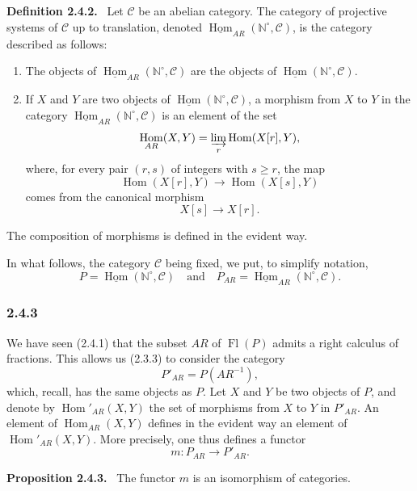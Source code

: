\documentclass[11pt]{article}
\providecommand{\uHom}{\underline{\Hom}}
\providecommand{\NN}{\mathbb{N}}
\newenvironment{statement}[1]{\par\medskip\noindent\textbf{#1.}\ }{\par\medskip}
\DeclareMathOperator{\Hom}{Hom}
\providecommand{\Hom}{\operatorname{Hom}}
\providecommand{\Fl}{\operatorname{Fl}}
\providecommand{\NN}{\mathbb N}
\providecommand{\cC}{\mathcal C}
\providecommand{\cC}{\mathcal C}
\providecommand{\Hom}{\operatorname{Hom}}
\begin{document}
\begin{statement}{Definition 2.4.2}
Let $\cC$ be an abelian category. The category of projective systems of $\cC$ up to translation, denoted $\uHom_{AR}(\NN^\circ,\cC)$, is the category described as follows:
\begin{enumerate}[label=(\roman*)]
\item The objects of $\uHom_{AR}(\NN^\circ,\cC)$ are the objects of $\uHom(\NN^\circ,\cC)$.
\item If $X$ and $Y$ are two objects of $\uHom(\NN^\circ,\cC)$, a morphism from $X$ to $Y$ in the category $\uHom_{AR}(\NN^\circ,\cC)$ is an element of the set
\[
\Hom_{AR}(X,Y)=\varinjlim_r\Hom(X[r],Y),
\]
where, for every pair $(r,s)$ of integers with $s\ge r$, the map
\[
\Hom(X[r],Y)\longrightarrow\Hom(X[s],Y)
\]
comes from the canonical morphism
\[
X[s]\longrightarrow X[r].
\]
\end{enumerate}
The composition of morphisms is defined in the evident way.
\end{statement}
In what follows, the category $\cC$ being fixed, we put, to simplify notation,
\[
P=\uHom(\NN^\circ,\cC)\quad\text{and}\quad P_{AR}=\uHom_{AR}(\NN^\circ,\cC).
\]

\subsubsection*{2.4.3}
We have seen (2.4.1) that the subset $AR$ of $\Fl(P)$ admits a right calculus of fractions. This allows us (2.3.3) to consider the category
\[
P'_{AR}=P(AR^{-1}),
\]
which, recall, has the same objects as $P$. Let $X$ and $Y$ be two objects of $P$, and denote by $\Hom'_{AR}(X,Y)$ the set of morphisms from $X$ to $Y$ in $P'_{AR}$. An element of $\Hom_{AR}(X,Y)$ defines in the evident way an element of $\Hom'_{AR}(X,Y)$. More precisely, one thus defines a functor
\[
m:P_{AR}\longrightarrow P'_{AR}.
\]

\begin{statement}{Proposition 2.4.3}
The functor $m$ is an isomorphism of categories.
\end{statement}
\end{document}
